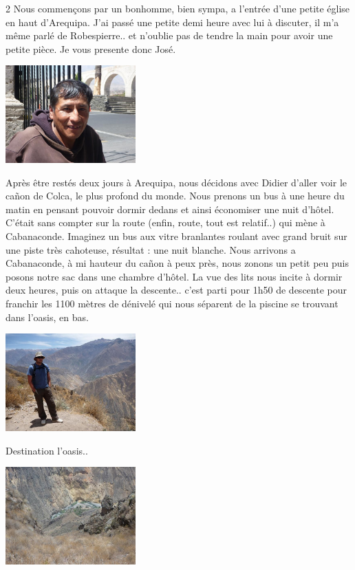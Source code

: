 \begin{multicols}{2}
Nous commençons par un bonhomme, bien sympa, a l'entrée d'une petite église en haut d'Arequipa. J'ai passé une petite demi heure avec lui à discuter, il m'a même parlé de Robespierre.. et n'oublie pas de tendre la main pour avoir une petite pièce. Je vous presente donc José.

\smallbreak
\includegraphics[width=5cm]{articles/Arequipa-colca-titicaca/1256606933jPp4.jpg}
\smallbreak

Après être restés deux jours à Arequipa, nous décidons avec Didier d'aller voir le cañon de Colca, le plus profond du monde. Nous prenons un bus à une heure du matin en pensant pouvoir dormir dedans et ainsi économiser une nuit d'hôtel. C'était sans compter sur la route (enfin, route, tout est relatif..) qui mène à Cabanaconde. Imaginez un bus aux vitre branlantes roulant avec grand bruit sur une piste très cahoteuse, résultat : une nuit blanche. Nous arrivons a Cabanaconde, à mi hauteur du cañon à peux près, nous zonons un petit peu puis posons notre sac dans une chambre d'hôtel. La vue des lits nous incite à dormir deux heures, puis on attaque la descente.. c'est parti pour 1h50 de descente pour franchir les 1100 mètres de dénivelé qui nous séparent de la piscine se trouvant dans l'oasis, en bas.

\smallbreak
\hspace*{-0.65cm}
\includegraphics[width=5cm]{articles/Arequipa-colca-titicaca/12566073542gHb.jpg}
\smallbreak

Destination l'oasis..

\smallbreak
\hspace*{-0.65cm}
\includegraphics[width=5cm]{articles/Arequipa-colca-titicaca/1256607360xfpT.jpg}
\smallbreak


\end{multicols}
